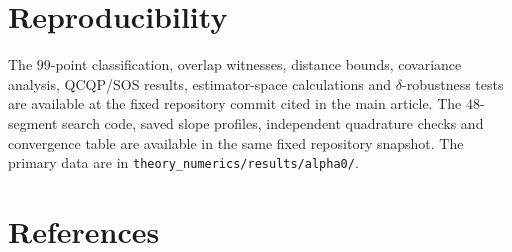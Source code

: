 \documentclass[12pt]{iopjournal}
\begin{document}
\section{Reproducibility}
The $99$-point classification, overlap witnesses, distance bounds, covariance analysis, QCQP/SOS results, estimator-space calculations and $\delta$-robustness tests are available at the fixed repository commit cited in the main article. The $48$-segment search code, saved slope profiles, independent quadrature checks and convergence table are available in the same fixed repository snapshot. The primary data are in \texttt{theory\_numerics/results/alpha0/}.

\FloatBarrier
\section*{References}
\printbibliography[heading=none]
\end{document}

